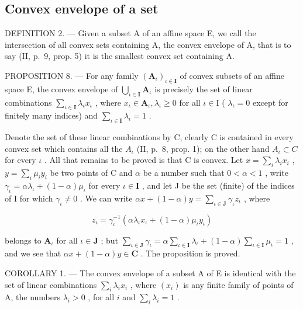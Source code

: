 \subsection{Convex envelope of a set}

DEFINITION 2. --- Given a subset A of an affine space E, we call the intersection of all convex sets containing A, the convex envelope of A, that is to say (II, p.~9, prop. 5) it is the smallest convex set containing A.

PROPOSITION 8. --- For any family \((\mathbf{A}_{\iota})_{\iota \in \mathbf{I}}\) of convex subsets of an affine space E, the convex envelope of \(\bigcup_{\iota \in \mathbf{I}}\mathbf{A}_{\iota}\) is precisely the set of linear combinations \(\sum_{\iota \in \mathbf{I}}\lambda_{\iota}x_{\iota}\) , where \(x_{\iota}\in \mathbf{A}_{\iota},\lambda_{\iota}\geqslant 0\) for all \(\iota \in \mathrm{I}\) ( \(\lambda_{\iota} = 0\) except for finitely many indices) and \(\sum_{\iota \in \mathbf{I}}\lambda_{\iota} = 1\) .

Denote the set of these linear combinations by C, clearly C is contained in every convex set which contains all the \(A_{\iota}\) (II, p.~8, prop. 1); on the other hand \(A_{\iota} \subset C\) for every \(\iota\) . All that remains to be proved is that C is convex. Let \(x = \sum_{i} \lambda_{i} x_{i}\) , \(y = \sum_{i} \mu_{i} y_{i}\) be two points of C and \(\alpha\) be a number such that \(0 < \alpha < 1\) , write \(\gamma_{\iota} = \alpha \lambda_{\iota} + (1 - \alpha)\mu_{\iota}\) for every \(\iota \in \mathbf{I}\) , and let J be the set (finite) of the indices of I for which \(\gamma_{\iota} \neq 0\) . We can write \(\alpha x + (1 - \alpha)y = \sum_{\iota \in \mathbf{J}}\gamma_{\iota}z_{\iota}\) , where

\[
z _ {\iota} = \gamma_ {\iota} ^ {- 1} (\alpha \lambda_ {\iota} x _ {\iota} + (1 - \alpha) \mu_ {\iota} y _ {\iota})
\]

belongs to \(\mathbf{A}_{\iota}\) for all \(\iota \in \mathbf{J}\) ; but \(\sum_{\iota \in \mathbf{J}} \gamma_{\iota} = \alpha \sum_{\iota \in \mathbf{I}} \lambda_{\iota} + (1 - \alpha) \sum_{\iota \in \mathbf{I}} \mu_{\iota} = 1\) , and we see that \(\alpha x + (1 - \alpha)y \in \mathbf{C}\) . The proposition is proved.

COROLLARY 1. --- The convex envelope of a subset A of E is identical with the set of linear combinations \(\sum_{i} \lambda_{i} x_{i}\) , where \((x_{i})\) is any finite family of points of A, the numbers \(\lambda_{i} > 0\) , for all \(i\) and \(\sum_{i} \lambda_{i} = 1\) .


